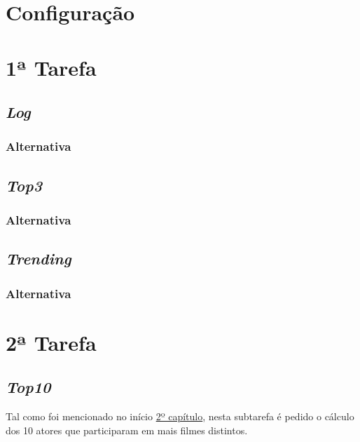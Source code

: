 \documentclass[a4paper]{report}
\begin{document}
{    \section{Configuração} \label{sec:Configuration}
    
	\section{1ª Tarefa} \label{sec:Task1}


		\subsection{\textit{Log}} \label{subsec:Task1-Log}
			\subsubsection{Alternativa} \label{sssec:Task1-Log-Alternativa}

		\subsection{\textit{Top3}} \label{subsec:Task1-Top3}
			\subsubsection{Alternativa} \label{sssec:Task1-Top3-Alternativa} 

		\subsection{\textit{Trending}} \label{subsec:Task1-Trending}
			\subsubsection{Alternativa} \label{sssec:Task1-Trending-Alternativa}

	\section{2ª Tarefa} \label{sec:Task2}


	\subsection{\textit{Top10}} \label{subsec:Task2-Top10}
		Tal como foi mencionado no início \hyperref[ch:Implementation]{2º capítulo}, nesta subtarefa é pedido o cálculo dos 10 atores que participaram em mais filmes distintos.

}
\end{document}
